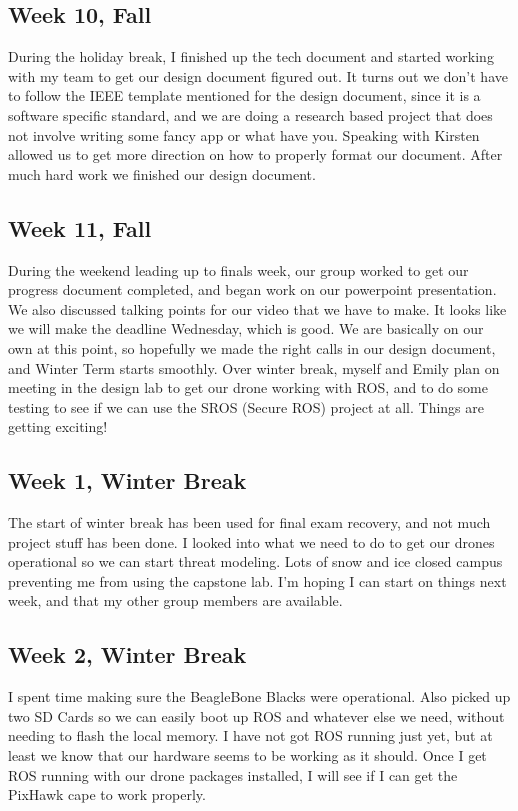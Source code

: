 \documentclass[IEEEtran,letterpaper,10pt,notitlepage,draftclsnofoot,onecolumn]{article}
\begin{document}
\subsection{Week 10, Fall}
During the holiday break, I finished up the tech document and started working with my team to get our design document figured out. It turns out we don't have to follow the IEEE template mentioned for the design document, since it is a software specific standard, and we are doing a research based project that does not involve writing some fancy app or what have you. Speaking with Kirsten allowed us to get more direction on how to properly format our document. After much hard work we finished our design document.
\subsection{Week 11, Fall}
During the weekend leading up to finals week, our group worked to get our progress document completed, and began work on our powerpoint presentation. We also discussed talking points for our video that we have to make. It looks like we will make the deadline Wednesday, which is good. We are basically on our own at this point, so hopefully we made the right calls in our design document, and Winter Term starts smoothly. Over winter break, myself and Emily plan on meeting in the design lab to get our drone working with ROS, and to do some testing to see if we can use the SROS (Secure ROS) project at all. Things are getting exciting!
\subsection{Week 1, Winter Break}
The start of winter break has been used for final exam recovery, and not much project stuff has been done. I looked into what we need to do to get our drones operational so we can start threat modeling. Lots of snow and ice closed campus preventing me from using the capstone lab. I'm hoping I can start on things next week, and that my other group members are available.
\subsection{Week 2, Winter Break}
I spent time making sure the BeagleBone Blacks were operational. Also picked up two SD Cards so we can easily boot up ROS and whatever else we need, without needing to flash the local memory. I have not got ROS running just yet, but at least we know that our hardware seems to be working as it should. Once I get ROS running with our drone packages installed, I will see if I can get the PixHawk cape to work properly.
\end{document}
